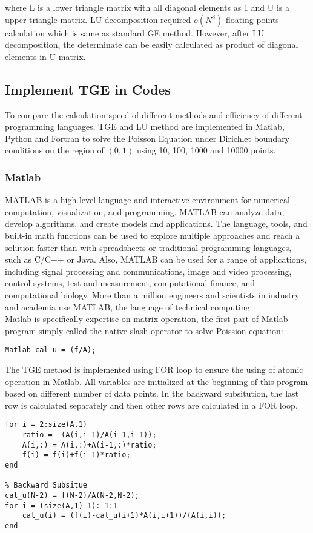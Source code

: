 \documentclass{article}
\begin{document}
where L is a lower triangle matrix with all diagonal elements as 1 and U is a upper triangle matrix. LU decomposition required $o(N^3)$ floating points calculation which is same as standard GE method. However, after LU decomposition, the determinate can be easily calculated as product of diagonal elements in U matrix.

\subsection{Implement TGE in Codes}

To compare the calculation speed of different methods and efficiency of different programming languages, TGE and LU method are implemented in Matlab, Python and Fortran to solve the Poisson Equation under Dirichlet boundary conditions on the region of $(0, 1)$ using 10, 100, 1000 and 10000 points.
\subsubsection{Matlab}
MATLAB is a high-level language and interactive environment for numerical computation, visualization, and programming. MATLAB can analyze data, develop algorithms, and create models and applications. The language, tools, and built-in math functions can be used to explore multiple approaches and reach a solution faster than with spreadsheets or traditional programming languages, such as C/C++ or Java. Also, MATLAB can be used for a range of applications, including signal processing and communications, image and video processing, control systems, test and measurement, computational finance, and computational biology. More than a million engineers and scientists in industry and academia use MATLAB, the language of technical computing. \\
Matlab is specifically expertise on matrix operation, the first part of Matlab program simply called the native slash operator to solve Poission equation:\\
 \begin{lstlisting}[frame=single]  
Matlab_cal_u = (f/A);
 \end{lstlisting}
 
 The TGE method is implemented using FOR loop to ensure the using of atomic operation in Matlab. All variables are initialized at the beginning of this program based on different number of data points. In the backward subsitution, the last row is calculated separately and then other rows are calculated in a FOR loop.
  \begin{lstlisting}[frame=single]  
% Forward Subsitute
for i = 2:size(A,1)
	ratio = -(A(i,i-1)/A(i-1,i-1));
	A(i,:) = A(i,:)+A(i-1,:)*ratio;
	f(i) = f(i)+f(i-1)*ratio;
end

% Backward Subsitue
cal_u(N-2) = f(N-2)/A(N-2,N-2);
for i = (size(A,1)-1):-1:1
	cal_u(i) = (f(i)-cal_u(i+1)*A(i,i+1))/(A(i,i));
end
  \end{lstlisting}
  
\end{document}
